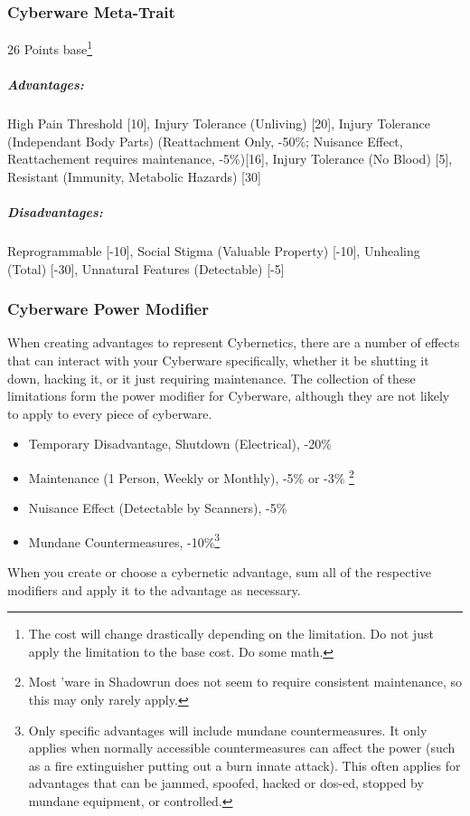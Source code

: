 \begin{multicols*}{3}
	\subsubsection*{Cyberware Meta-Trait}
	\begin{flushright}
		26 Points base\footnote{The cost will change drastically depending on the limitation. Do not just apply the limitation to the base cost. Do some math.}
	\end{flushright}
	\subparagraph{Advantages:}
	High Pain Threshold [10], Injury Tolerance (Unliving) [20], Injury Tolerance (Independant Body Parts) (Reattachment Only, -50\%; Nuisance Effect, Reattachement requires maintenance, -5\%)[16], Injury Tolerance (No Blood) [5], Resistant (Immunity, Metabolic Hazards) [30]
	\subparagraph{Disadvantages:}
	Reprogrammable [-10], Social Stigma (Valuable Property) [-10], Unhealing (Total) [-30], Unnatural Features (Detectable) [-5]
	
	\subsubsection{Cyberware Power Modifier}
	
	When creating advantages to represent Cybernetics, there are a number of effects that can interact with your Cyberware specifically, whether it be shutting it down, hacking it, or it just requiring maintenance. The collection of these limitations form the power modifier for Cyberware, although they are not likely to apply to every piece of cyberware.
	
	\begin{itemize}
		\item Temporary Disadvantage, Shutdown (Electrical), -20\%
		\item Maintenance (1 Person, Weekly or Monthly), -5\% or -3\% \footnote{Most 'ware in Shadowrun does not seem to require consistent maintenance, so this may only rarely apply.}
		\item Nuisance Effect (Detectable by Scanners), -5\%
		\item Mundane Countermeasures, -10\%\footnote{Only specific advantages will include mundane countermeasures. It only applies when normally accessible countermeasures can affect the power (such as a fire extinguisher putting out a burn innate attack). This often applies for advantages that can be jammed, spoofed, hacked or dos-ed, stopped by mundane equipment, or controlled.}
	\end{itemize}
	
	When you create or choose a cybernetic advantage, sum all of the respective modifiers and apply it to the advantage as necessary.
	

\end{multicols*}
